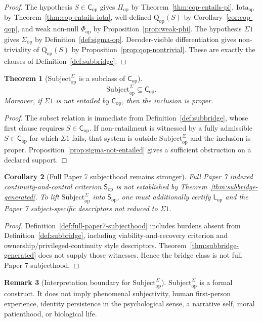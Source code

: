 \documentclass[11pt,a4paper]{article}
\newtheorem{theorem}{Theorem}[section]
\newtheorem{corollary}[theorem]{Corollary}
\theoremstyle{definition}
\newtheorem{remark}[theorem]{Remark}
\newcommand{\Cop}{\mathsf{C}_{\mathrm{op}}}
\newcommand{\Subop}{\mathsf{S}_{\mathrm{op}}}
\newcommand{\Subbridge}{\mathrm{Subject}^{\Sigma}_{\mathrm{op}}}
\newcommand{\Lop}{\mathsf{L}_{\mathrm{op}}}
\newcommand{\Qop}{\mathrm{Q}_{\mathrm{op}}}
\newcommand{\Sigmaop}{\Sigma_{\mathrm{op}}}
\newcommand{\Piop}{\Pi_{\mathrm{op}}}
\newcommand{\Iotaop}{\mathrm{Iota}_{\mathrm{op}}}
\newcommand{\Phiop}{\Phi_{\mathrm{op}}}
\begin{document}
\begin{proof}
The hypothesis $S\in\Cop$ gives $\Piop$ by Theorem~\ref{thm:cop-entails-pi}, $\Iotaop$ by Theorem~\ref{thm:cop-entails-iota}, well-defined $\Qop(S)$ by Corollary~\ref{cor:cop-qop}, and weak non-null $\Phiop$ by Proposition~\ref{prop:weak-phi}. The hypothesis $\Sigma1$ gives $\Sigmaop$ by Definition~\ref{def:sigma-op}. Decoder-visible differentiation gives non-triviality of $\Qop(S)$ by Proposition~\ref{prop:qop-nontrivial}. These are exactly the clauses of Definition~\ref{def:subbridge}.
\end{proof}

\begin{theorem}[$\Subbridge$ is a subclass of $\Cop$]\label{thm:subbridge-subset}
\[
\Subbridge \subseteq \Cop.
\]
Moreover, if $\Sigma1$ is not entailed by $\Cop$, then the inclusion is proper.
\end{theorem}

\begin{proof}
The subset relation is immediate from Definition~\ref{def:subbridge}, whose first clause requires $S\in\Cop$. If non-entailment is witnessed by a fully admissible $S\in\Cop$ for which $\Sigma1$ fails, that system is outside $\Subbridge$ and the inclusion is proper. Proposition~\ref{prop:sigma-not-entailed} gives a sufficient obstruction on a declared support.
\end{proof}

\begin{corollary}[Full Paper 7 subjecthood remains stronger]\label{cor:paper7-stronger}
Full Paper 7 indexed continuity-and-control criterion $\Subop$ is not established by Theorem~\ref{thm:subbridge-generated}. To lift $\Subbridge$ into $\Subop$, one must additionally certify $\Lop$ and the Paper 7 subject-specific descriptors not reduced to $\Sigma1$.
\end{corollary}

\begin{proof}
Definition~\ref{def:full-paper7-subjecthood} includes burdens absent from Definition~\ref{def:subbridge}, including viability-and-recovery criterion and ownership/privileged-continuity style descriptors. Theorem~\ref{thm:subbridge-generated} does not supply those witnesses. Hence the bridge class is not full Paper 7 subjecthood.
\end{proof}

\begin{remark}[Interpretation boundary for $\Subbridge$]
$\Subbridge$ is a formal construct. It does not imply phenomenal subjectivity, human first-person experience, identity persistence in the psychological sense, a narrative self, moral patienthood, or biological life.
\end{remark}
\end{document}
